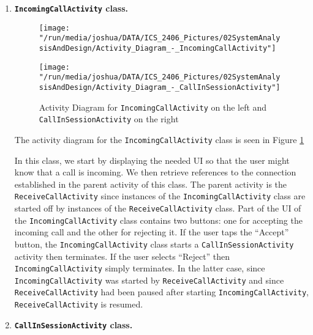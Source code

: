 \documentclass[12pt,svgnames,smaller]{article} %
\begin{document}
\begin{enumerate}
		\item \textbf{\texttt{IncomingCallActivity} class.} 

		\begin{figure}
			\centering
			\begin{minipage}{0.5\textwidth}
				\centering
				\texttt{[image: "/run/media/joshua/DATA/ICS\_2406\_Pictures/02SystemAnalysisAndDesign/Activity\_Diagram\_-\_IncomingCallActivity"]}
			\end{minipage}%
			\begin{minipage}{0.5\textwidth}
				\centering
				\texttt{[image: "/run/media/joshua/DATA/ICS\_2406\_Pictures/02SystemAnalysisAndDesign/Activity\_Diagram\_-\_CallInSessionActivity"]}
			\end{minipage}
			\caption{Activity Diagram for \texttt{IncomingCallActivity} on the left and \texttt{CallInSessionActivity} on the right}
			\label{fig:SystemAnalysisandDesign-Activity_Diagram_-_IncomingCallActivity,_CallInSessionActivity}		
		\end{figure}
		
		The activity diagram for the \texttt{IncomingCallActivity} class is seen in Figure \ref{fig:SystemAnalysisandDesign-Activity_Diagram_-_IncomingCallActivity,_CallInSessionActivity}
		
		In this class, we start by displaying the needed UI so that the user might know that a call is incoming. We then retrieve references to the connection established in the parent activity of this class. The parent activity is the \texttt{ReceiveCallActivity} since instances of the \texttt{IncomingCallActivity} class are started off by instances of the \texttt{ReceiveCallActivity} class. Part of the UI of the \texttt{IncomingCallActivity} class contains two buttons: one for accepting the incoming call and the other for rejecting it. If the user taps the “Accept” button, the \texttt{IncomingCallActivity} class starts a \texttt{CallInSessionActivity} activity then terminates. If the user selects “Reject” then \texttt{IncomingCallActivity} simply terminates. In the latter case, since \texttt{IncomingCallActivity} was started by \texttt{ReceiveCallActivity} and since \texttt{ReceiveCallActivity} had been paused after starting \texttt{IncomingCallActivity}, \texttt{ReceiveCallActivity} is resumed.
		
		\item \textbf{\texttt{CallInSessionActivity} class.} 
		

\end{enumerate}
\end{document}
